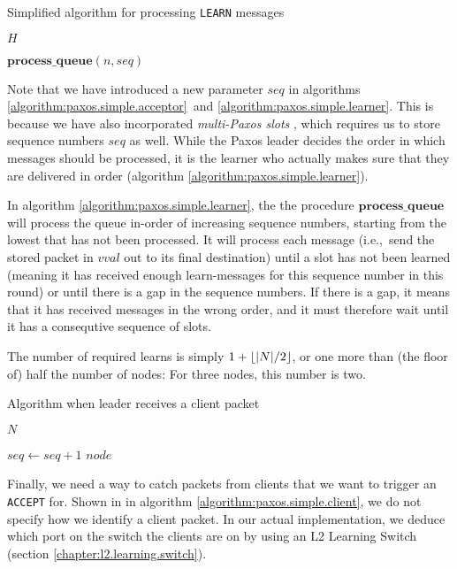 \begin{algorithm}[H]
  \caption{Simplified algorithm for processing \texttt{LEARN} messages}
  \label{algorithm:paxos.simple.learner}
  \begin{algorithmic}
    \State $H$ 
    \State

        \State $\textbf{process\_queue}(n, seq)$
      \EndIf
    \EndOn
  \end{algorithmic}
\end{algorithm}

Note that we have introduced a new parameter $seq$ in algorithms
\ref{algorithm:paxos.simple.acceptor} and
\ref{algorithm:paxos.simple.learner}.
This is because we have also incorporated \textit{multi-Paxos slots} \cite{renesse.paxos},
which requires us to store sequence numbers $seq$ as well.
While the Paxos leader decides the order in which messages should be
processed, it is the learner who actually makes sure that they are delivered
in order (algorithm \vref{algorithm:paxos.simple.learner}).

In algorithm \ref{algorithm:paxos.simple.learner}, the
the procedure $\textbf{process\_queue}$ will process the queue in-order of
increasing sequence numbers, starting from the lowest that has not been
processed.  It will process each message (i.e.,~send the stored packet in
$vval$ out to its final destination) until a slot has not been learned
(meaning it has received enough learn-messages for this sequence number in
 this round)  or until there is a gap in the sequence numbers.
If there is a gap, it means that it has received messages in the wrong
order, and it must therefore wait until it has a consequtive sequence of
slots.

The number of required learns is simply $1+\floor*{|N|/2}$, or one more than
(the floor of) half the number of nodes: For three nodes, this number is
two.

\begin{algorithm}[H]
  \caption{Algorithm when leader receives a client packet}
  \label{algorithm:paxos.simple.client}
  \begin{algorithmic}
    \State $N$
    \State

      \State $seq \gets seq + 1$ 
        \State {}
                      {$node$}
      \EndForIn
    \EndOn
  \end{algorithmic}
\end{algorithm}

Finally, we need a way to catch packets from clients that we want to trigger
an \texttt{ACCEPT} for.  Shown in in algorithm
\ref{algorithm:paxos.simple.client}, we do not specify how we identify a
client packet.  In our actual implementation, we deduce which port on the
switch the clients are on by using an L2 Learning Switch
(section \vref{chapter:l2.learning.switch}).
